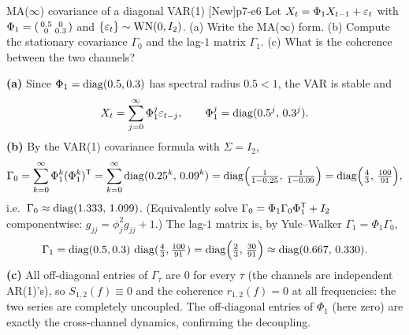 \begin{exercise}{MA($\infty$) covariance of a diagonal VAR(1) \quad\textnormal{[New]}}{p7-e6}
Let $X_t=\Phi_1 X_{t-1}+\varepsilon_t$ with
$\Phi_1=\begin{psmallmatrix}0.5&0\\0&0.3\end{psmallmatrix}$ and
$\{\varepsilon_t\}\sim\mathrm{WN}(0,I_2)$. (a) Write the MA($\infty$) form. (b) Compute
the stationary covariance $\Gamma_0$ and the lag-$1$ matrix $\Gamma_1$. (c) What
is the coherence between the two channels?
\end{exercise}
\begin{solution}
\textbf{(a)} Since $\Phi_1=\operatorname{diag}(0.5,0.3)$ has spectral radius $0.5<1$, the VAR
is stable and
\[
X_t=\sum_{j=0}^\infty\Phi_1^j\varepsilon_{t-j},\qquad
\Phi_1^j=\operatorname{diag}(0.5^j,\,0.3^j).
\]
\textbf{(b)} By the VAR(1) covariance formula with $\Sigma=I_2$,
\[
\Gamma_0=\sum_{k=0}^\infty\Phi_1^k(\Phi_1^k)^{\mathsf{T}}
=\sum_{k=0}^\infty\operatorname{diag}(0.25^k,\,0.09^k)
=\operatorname{diag}\!\Big(\tfrac{1}{1-0.25},\,\tfrac{1}{1-0.09}\Big)
=\operatorname{diag}\!\Big(\tfrac43,\,\tfrac{100}{91}\Big),
\]
i.e.\ $\Gamma_0\approx\operatorname{diag}(1.333,\,1.099)$. (Equivalently solve
$\Gamma_0=\Phi_1\Gamma_0\Phi_1^{\mathsf{T}}+I_2$ componentwise:
$g_{jj}=\phi_j^2 g_{jj}+1$.) The lag-$1$ matrix is, by Yule--Walker
$\Gamma_1=\Phi_1\Gamma_0$,
\[
\Gamma_1=\operatorname{diag}(0.5,0.3)\,\operatorname{diag}(\tfrac43,\tfrac{100}{91})
=\operatorname{diag}\!\Big(\tfrac23,\,\tfrac{30}{91}\Big)\approx\operatorname{diag}(0.667,\,0.330).
\]
\textbf{(c)} All off-diagonal entries of $\Gamma_\tau$ are $0$ for every $\tau$
(the channels are independent AR(1)'s), so $S_{1,2}(f)\equiv0$ and the coherence
$r_{1,2}(f)=0$ at all frequencies: the two series are completely uncoupled. The
off-diagonal entries of $\Phi_1$ (here zero) are exactly the cross-channel
dynamics, confirming the decoupling.
\end{solution}

